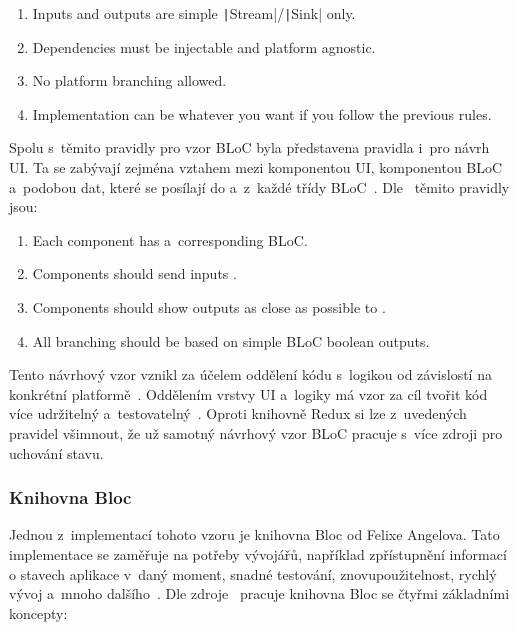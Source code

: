 \begin{enumerate}
    \item Inputs and outputs are simple
    \texttt|Stream|/\texttt|Sink| only.
    \item Dependencies must be injectable and platform agnostic.
    \item No platform branching allowed.
    \item Implementation can be whatever you want
    if you follow the previous rules.
\end{enumerate}

Spolu s~těmito pravidly pro vzor BLoC byla představena
pravidla i~pro návrh UI.
Ta se zabývají zejména vztahem mezi komponentou UI, komponentou BLoC
a~podobou dat,
které se posílají do a~z~každé třídy BLoC~\cite{googledevelopers_bloc}.
Dle~\cite{googledevelopers_bloc} těmito pravidly jsou:

\begin{enumerate}
    \item Each  component has a~corresponding BLoC.
    \item Components should send inputs .
    \item Components should show outputs as close as possible to .
    \item All branching should be based on simple BLoC boolean outputs.
\end{enumerate}

Tento návrhový vzor vznikl za účelem oddělení kódu s~logikou
od závislostí na konkrétní platformě~\cite{googledevelopers_bloc}.
Oddělením vrstvy UI a~logiky má vzor za cíl tvořit kód více udržitelný
a~testovatelný~\cite{flutterando_analyzing_bloc_mobx}.
Oproti knihovně Redux si lze z~uvedených pravidel všimnout,
že už samotný návrhový vzor BLoC pracuje s~více zdroji pro uchování stavu.

\subsubsection{Knihovna Bloc}

Jednou z~implementací tohoto vzoru je knihovna Bloc od Felixe
Angelova.
Tato implementace se zaměřuje na potřeby vývojářů,
například zpřístupnění informací o stavech aplikace v~daný moment,
snadné testování, znovupoužitelnost, rychlý vývoj a~mnoho dalšího~\cite{bloclibrary_whybloc}. 
Dle zdroje~\cite{bloclibrary_coreconcepts} pracuje knihovna Bloc se čtyřmi
základními koncepty: 

